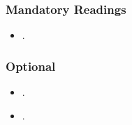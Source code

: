 \documentclass[abstract=on,parskip=full,headings=standardclasses,fontsize=11pt,paper=a4]{scrartcl}
\begin{document}
\subsubsection*{Mandatory Readings}
\begin{itemize}
\item {}.
\end{itemize}


\subsubsection*{Optional}
\begin{itemize}
\item {}.
\item {}.
\end{itemize}

\end{document}
